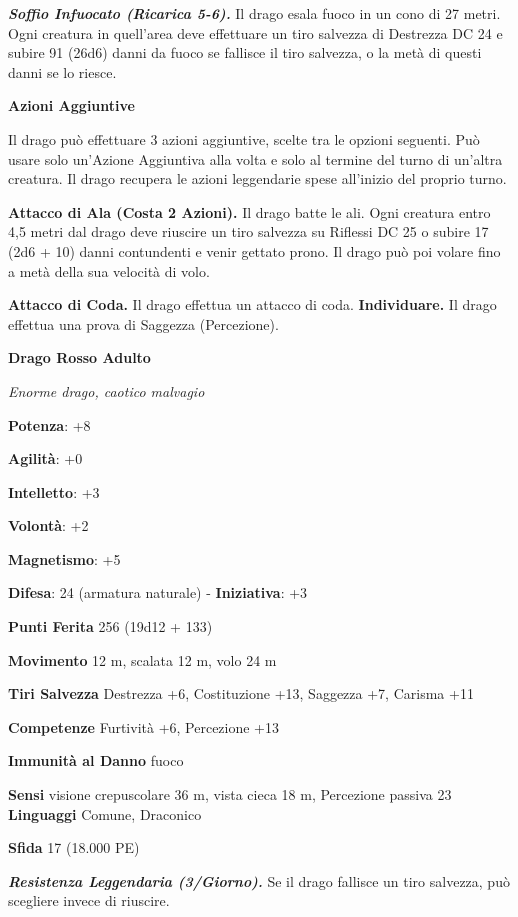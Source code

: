 \begin{multicols}{2}
\emph{\textbf{Soffio Infuocato (Ricarica 5-6).}} Il drago esala fuoco in
un cono di 27 metri. Ogni creatura in quell'area deve effettuare un tiro
salvezza di Destrezza DC 24 e subire 91 (26d6) danni da fuoco se
fallisce il tiro salvezza, o la metà di questi danni se lo riesce.

\textbf{Azioni Aggiuntive}

Il drago può effettuare 3 azioni aggiuntive, scelte tra le opzioni
seguenti. Può usare solo un'Azione Aggiuntiva alla volta e solo al
termine del turno di un'altra creatura. Il drago recupera le azioni
leggendarie spese all'inizio del proprio turno.

\textbf{Attacco di Ala (Costa 2 Azioni).} Il drago batte le ali. Ogni
creatura entro 4,5 metri dal drago deve riuscire un tiro salvezza su Riflessi DC 25 o subire 17 (2d6 + 10) danni contundenti e venir gettato
prono. Il drago può poi volare fino a metà della sua velocità di volo.

\textbf{Attacco di Coda.} Il drago effettua un attacco di coda.
\textbf{Individuare.} Il drago effettua una prova di Saggezza
(Percezione).

\textbf{Drago Rosso Adulto}

\emph{Enorme drago, caotico malvagio}

\textbf{Potenza}: +8

\textbf{Agilità}: +0

\textbf{Intelletto}: +3

\textbf{Volontà}: +2

\textbf{Magnetismo}: +5

\textbf{Difesa}: 24 (armatura naturale) - \textbf{Iniziativa}: +3

\textbf{Punti Ferita} 256 (19d12 + 133)

\textbf{Movimento} 12 m, scalata 12 m, volo 24 m

\textbf{Tiri Salvezza} Destrezza +6, Costituzione +13, Saggezza +7,
Carisma +11

\textbf{Competenze} Furtività +6, Percezione +13

\textbf{Immunità al Danno} fuoco

\textbf{Sensi} visione crepuscolare 36 m, vista cieca 18 m, Percezione passiva
23 \textbf{Linguaggi} Comune, Draconico

\textbf{Sfida} 17 (18.000 PE)

\emph{\textbf{Resistenza Leggendaria (3/Giorno).}} Se il drago fallisce
un tiro salvezza, può scegliere invece di riuscire.


\end{multicols}
